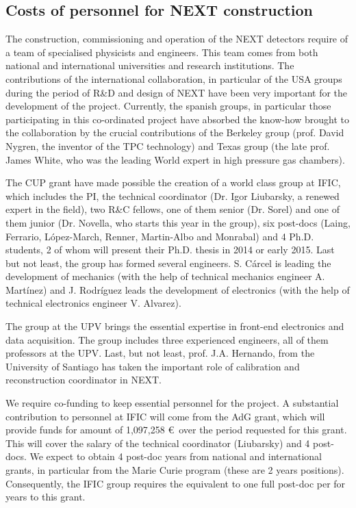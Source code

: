 \subsection{Costs of personnel for NEXT construction}

The construction, commissioning and operation of the NEXT detectors require of a team of specialised physicists and engineers. This team comes from both national and international universities and research institutions. The contributions of the international collaboration, in particular of the USA groups during the period of R\&D and design of NEXT have been very important for the development of the project. Currently, the spanish groups, in particular those participating in this co-ordinated project have absorbed the know-how brought to the collaboration by the crucial contributions of the Berkeley group (prof. David Nygren, the inventor of the TPC technology) and Texas group (the late prof. James White, who was the leading World expert in high pressure gas chambers). 

The CUP grant have made possible the creation of a world class group at IFIC, which includes the PI, the technical coordinator (Dr. Igor Liubarsky, a renewed expert in the field), two R\&C fellows, one of them senior (Dr. Sorel) and one of them junior (Dr. Novella, who starts this year in the group), six post-docs  (Laing, Ferrario, L\'opez-March,  Renner, Martin-Albo and Monrabal) and 4 Ph.D. students, 2 of whom will present their Ph.D. thesis in 2014 or early 2015. Last but not least, the group has formed several engineers. S. C\'arcel is leading the development of mechanics (with the help of technical mechanics engineer A. Mart\'inez) and J. Rodr\'iguez leads the development of electronics (with the help of technical electronics engineer V. Alvarez).

The group at the UPV brings the essential expertise in front-end electronics and data acquisition. The group includes three experienced engineers, all of them professors at the UPV. Last, but not least, prof. J.A. Hernando, from the University of Santiago has taken the important role of calibration and reconstruction coordinator in NEXT. 

We require co-funding to keep essential personnel for the project. A substantial contribution to personnel at IFIC will come from the  AdG grant, which will provide funds for amount of 1,097,258 \euro\ over the period requested for this grant. This will cover the salary of the technical coordinator (Liubarsky) and 4 post-docs. We expect to obtain 4 post-doc years from national and international grants, in particular from the Marie Curie program (these are 2 years positions). Consequently, the IFIC group requires the equivalent to one full post-doc per for years to this grant.  

